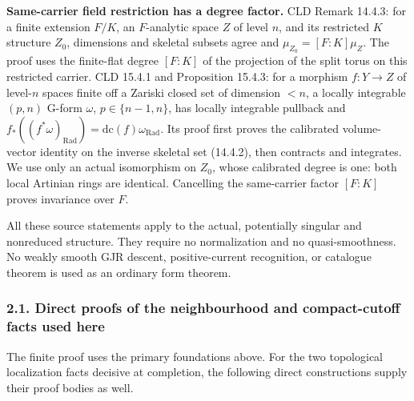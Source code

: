 \documentclass[
  11pt,
]{article}
\begin{document}
\begin{enumerate}
  \textbf{Same-carrier field restriction has a degree factor.} CLD
  Remark 14.4.3: for a finite extension \(F/K\), an \(F\)-analytic space
  \(Z\) of level \(n\), and its restricted \(K\) structure \(Z_0\),
  dimensions and skeletal subsets agree and \(\mu_{Z_0}=[F:K]\mu_Z\).
  The proof uses the finite-flat degree \([F:K]\) of the projection of
  the split torus on this restricted carrier. CLD 15.4.1 and Proposition
  15.4.3: for a morphism \(f:Y\to Z\) of level-\(n\) spaces finite off a
  Zariski closed set of dimension \(<n\), a locally integrable \((p,n)\)
  G-form \(\omega\), \(p\in\{n-1,n\}\), has locally integrable pullback
  and
  \(f_*((f^*\omega)_{\mathrm{Rad}})=\mathrm{dc}(f)\omega_{\mathrm{Rad}}\).
  Its proof first proves the calibrated volume-vector identity on the
  inverse skeletal set (14.4.2), then contracts and integrates. We use
  only an actual isomorphism on \(Z_0\), whose calibrated degree is one:
  both local Artinian rings are identical. Cancelling the same-carrier
  factor \([F:K]\) proves invariance over \(F\).
\end{enumerate}

All these source statements apply to the actual, potentially singular
and nonreduced structure. They require no normalization and no
quasi-smoothness. No weakly smooth GJR descent, positive-current
recognition, or catalogue theorem is used as an ordinary form theorem.

\subsubsection{2.1. Direct proofs of the neighbourhood and
compact-cutoff facts used
here}\label{direct-proofs-of-the-neighbourhood-and-compact-cutoff-facts-used-here}

The finite proof uses the primary foundations above. For the two
topological localization facts decisive at completion, the following
direct constructions supply their proof bodies as well.
\end{document}
